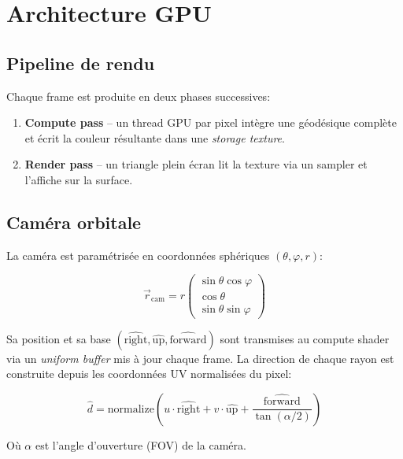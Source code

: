 \documentclass[12pt, a4paper]{article}
\begin{document}
\section{Architecture GPU}

\subsection{Pipeline de rendu}

Chaque frame est produite en deux phases successives:

\begin{enumerate}
    \item \textbf{Compute pass} \--- un thread GPU par pixel intègre une géodésique
    complète et écrit la couleur résultante dans une \emph{storage texture}.
    \item \textbf{Render pass} \--- un triangle plein écran lit la texture via un
    sampler et l'affiche sur la surface.
\end{enumerate}

\subsection{Caméra orbitale}

La caméra est paramétrisée en coordonnées sphériques $(\theta, \varphi, r)$:

\begin{equation}
    \vec{r}_{\text{cam}} = r
    \begin{pmatrix}
        \sin\theta\cos\varphi \\
        \cos\theta \\
        \sin\theta\sin\varphi
    \end{pmatrix}
\end{equation}

Sa position et sa base $(\hat{\text{right}}, \hat{\text{up}}, \hat{\text{forward}})$
sont transmises au compute shader via un \emph{uniform buffer} mis à jour chaque frame.
La direction de chaque rayon est construite depuis les coordonnées UV normalisées du pixel:

\begin{equation}
    \hat{d} = \text{normalize}\!\left(
        u \cdot \hat{\text{right}} +
        v \cdot \hat{\text{up}} +
        \frac{\hat{\text{forward}}}{\tan(\alpha/2)}
    \right)
\end{equation}

Où $\alpha$ est l'angle d'ouverture (FOV) de la caméra.
\end{document}
